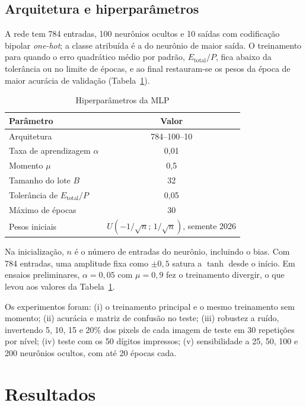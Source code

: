 \documentclass[12pt,a4paper]{article}
\newcommand{\fonte}[1]{\par\vspace{2pt}{\small Fonte: #1}\par}
\begin{document}
\subsection{Arquitetura e hiperparâmetros}

A rede tem 784 entradas, 100 neurônios ocultos e 10 saídas com codificação bipolar
\textit{one-hot}; a classe atribuída é a do neurônio de maior saída. O treinamento para
quando o erro quadrático médio por padrão, $E_{\text{total}}/P$, fica abaixo da tolerância
ou no limite de épocas, e ao final restauram-se os pesos da época de maior acurácia de
validação (Tabela~\ref{tab:hiper}).

\begin{table}[H]
  \centering
  \caption{Hiperparâmetros da MLP}
  \label{tab:hiper}
  \begin{tabular}{lc}
    \toprule
    Parâmetro & Valor \\
    \midrule
    Arquitetura & 784--100--10 \\
    Taxa de aprendizagem $\alpha$ & 0,01 \\
    Momento $\mu$ & 0,5 \\
    Tamanho do lote $B$ & 32 \\
    Tolerância de $E_{\text{total}}/P$ & 0,05 \\
    Máximo de épocas & 30 \\
    Pesos iniciais & $U(-1/\sqrt{n};\,1/\sqrt{n})$, semente 2026 \\
    \bottomrule
  \end{tabular}
  \fonte{elaborada pelo autor (2026).}
\end{table}

Na inicialização, $n$ é o número de entradas do neurônio, incluindo o bias. Com 784
entradas, uma amplitude fixa como $\pm0{,}5$ satura a $\tanh$ desde o início. Em ensaios
preliminares, $\alpha=0{,}05$ com $\mu=0{,}9$ fez o treinamento divergir, o que levou aos
valores da Tabela~\ref{tab:hiper}.

Os experimentos foram: (i) o treinamento principal e o mesmo treinamento sem momento;
(ii) acurácia e matriz de confusão no teste; (iii) robustez a ruído, invertendo 5, 10, 15
e 20\% dos pixels de cada imagem de teste em 30 repetições por nível; (iv) teste com os 50
dígitos impressos; (v) sensibilidade a 25, 50, 100 e 200 neurônios ocultos, com até 20
épocas cada.

\section{Resultados}
\end{document}
